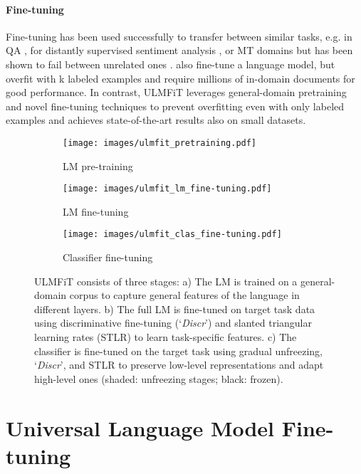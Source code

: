 \documentclass[11pt,a4paper]{article}
\begin{document}
\paragraph{Fine-tuning} Fine-tuning has been used successfully to transfer between similar tasks, e.g. in QA \cite{Min2017}, for distantly supervised sentiment analysis \cite{Severyn2015a}, or MT domains \cite{sennrich2015improving} but has been shown to fail between unrelated ones \cite{Mou2016}.  also fine-tune a language model, but overfit with k labeled examples and require millions of in-domain documents for good performance. In contrast, ULMFiT leverages general-domain pretraining and novel fine-tuning techniques to prevent overfitting even with only  labeled examples and achieves state-of-the-art results also on small datasets.


\begin{figure*}[!htb]
\begin{subfigure}{.30\linewidth}
      \centering
         \texttt{[image: images/ulmfit\_pretraining.pdf]}
    \caption{LM pre-training} \label{fig:lm-pretraining}
    \end{subfigure}\hspace*{0.4cm}
    \begin{subfigure}{.30\linewidth}
      \centering
         \texttt{[image: images/ulmfit\_lm\_fine-tuning.pdf]}
    \caption{LM fine-tuning} \label{fig:lm-fine-tuning}
    \end{subfigure}
    \hspace*{0.4cm}
    \begin{subfigure}{.30\linewidth}
      \centering
         \texttt{[image: images/ulmfit\_clas\_fine-tuning.pdf]}
    \caption{Classifier fine-tuning} \label{fig:classifier-fine-tuning}
    \end{subfigure}
    \caption{ULMFiT consists of three stages: a) The LM is trained on a general-domain corpus to capture general features of the language in different layers. b) The full LM is fine-tuned on target task data using discriminative fine-tuning (`\emph{Discr}') and slanted triangular learning rates (STLR) to learn task-specific features. c) The classifier is fine-tuned on the target task using gradual unfreezing, `\emph{Discr}', and STLR to preserve low-level representations and adapt high-level ones (shaded: unfreezing stages; black: frozen).}
\label{fig:ulmfit}
\end{figure*}

\section{Universal Language Model Fine-tuning}
\end{document}
